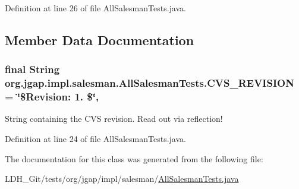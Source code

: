 Definition at line 26 of file All\-Salesman\-Tests.\-java.



\subsection{Member Data Documentation}
\hypertarget{classorg_1_1jgap_1_1impl_1_1salesman_1_1_all_salesman_tests_aa0ebd66480f3e5d35d00483209827ca2}{
\subsubsection[{C\-V\-S\-\_\-\-R\-E\-V\-I\-S\-I\-O\-N}]{\setlength{\rightskip}{0pt plus 5cm}final String org.\-jgap.\-impl.\-salesman.\-All\-Salesman\-Tests.\-C\-V\-S\-\_\-\-R\-E\-V\-I\-S\-I\-O\-N = \char`\"{}\$Revision\-: 1. \$\char`\"{}\hspace{0.3cm}{\ttfamily [static]}, {\ttfamily [private]}}}\label{classorg_1_1jgap_1_1impl_1_1salesman_1_1_all_salesman_tests_aa0ebd66480f3e5d35d00483209827ca2}
String containing the C\-V\-S revision. Read out via reflection! 

Definition at line 24 of file All\-Salesman\-Tests.\-java.



The documentation for this class was generated from the following file\-:\begin{DoxyCompactItemize}
\item 
L\-D\-H\-\_\-\-Git/tests/org/jgap/impl/salesman/\hyperlink{_all_salesman_tests_8java}{All\-Salesman\-Tests.\-java}\end{DoxyCompactItemize}
